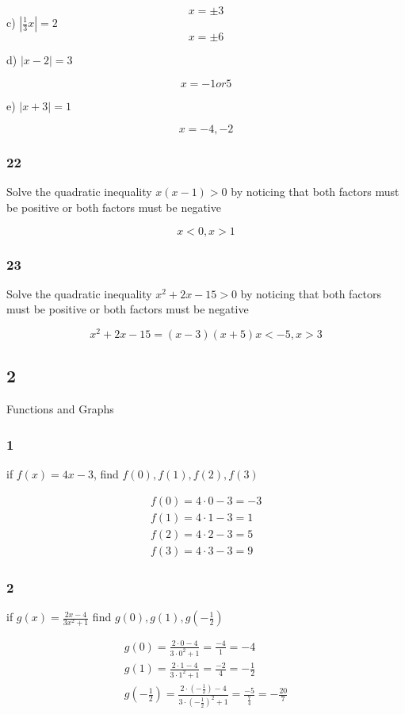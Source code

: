 \documentclass[]{report}
\begin{document}
\[
x = \pm 3
\]
c) $|\frac{1}{3}x| = 2 $
\[
x = \pm 6
\]

d) $|x-2| = 3 $

\[
x = -1 or 5
\]

e) $|x + 3 | = 1$

\[
x = -4, -2
\]

\subsubsection{22}

Solve the quadratic inequality $x(x-1) > 0$ by noticing that both factors must be positive or both factors must be negative

\[
x < 0 , x > 1
\]

\subsubsection{23}
Solve the quadratic inequality $x^2 + 2x - 15 > 0$ by noticing that both factors must be positive or both factors must be negative

\[
x^2 + 2x - 15  = (x - 3)(x + 5)
x < -5, x > 3
\]

\subsection{2} Functions and Graphs

\subsubsection{1}
if $f(x) = 4x-3$, find $f(0), f(1), f(2), f(3)$

\begin{align*}
f(0) = 4\cdot0 - 3 = -3\\
f(1) = 4\cdot1 - 3 = 1 \\
f(2) = 4\cdot2 - 3 = 5 \\
f(3) = 4\cdot3 - 3 = 9
\end{align*}

\subsubsection{2}
if $g(x) = \frac{2x-4}{3x^2 + 1}$ find $g(0), g(1), g(-\frac{1}{2})$


\begin{align*}
g(0) = \frac{2\cdot0-4}{3\cdot0^2 + 1} = \frac{-4}{1} = -4\\
g(1) = \frac{2\cdot1 - 4}{3\cdot1^2 + 1} = \frac{-2}{4} = -\frac{1}{2}\\
g(-\frac{1}{2}) = \frac{2\cdot(-\frac{1}{2}) - 4}{3\cdot(-\frac{1}{2})^2 + 1} = \frac{-5}{\frac{7}{4}} = -\frac{20}{7}
\end{align*}
\end{document}
